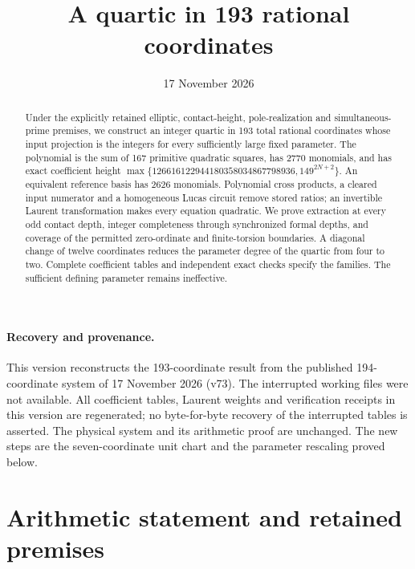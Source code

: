 \documentclass[11pt,a4paper]{article}
\title{A quartic in 193 rational coordinates}
\author{}\date{17 November 2026}
\begin{document}
\maketitle

\begin{abstract}
Under the explicitly retained elliptic, contact-height, pole-realization
and simultaneous-prime premises, we construct an integer quartic in
193 total rational coordinates whose input projection is the integers
for every sufficiently large fixed parameter. The polynomial is the
sum of 167 primitive quadratic squares, has 2770 monomials, and has
exact coefficient height
$\max\{126616122944180358034867798936,149^{2N+2}\}$.
An equivalent reference basis has 2626 monomials. Polynomial cross
products, a cleared input numerator and a homogeneous Lucas circuit
remove stored ratios; an invertible Laurent transformation makes every
equation quadratic. We prove extraction at every odd contact depth,
integer completeness through synchronized formal depths, and coverage
of the permitted zero-ordinate and finite-torsion boundaries. A diagonal change of twelve coordinates reduces the parameter degree
of the quartic from four to two. Complete coefficient tables and
independent exact checks specify the families.
The sufficient defining parameter remains ineffective.
\end{abstract}

\paragraph{Recovery and provenance.}
This version reconstructs the 193-coordinate result from the published
194-coordinate system of 17 November 2026 (v73). The interrupted
working files were not available. All coefficient tables, Laurent
weights and verification receipts in this version are regenerated;
no byte-for-byte recovery of the interrupted tables is asserted.
The physical system and its arithmetic proof are unchanged. The new
steps are the seven-coordinate unit chart and the parameter rescaling
proved below.


\section{Arithmetic statement and retained premises}
\end{document}
